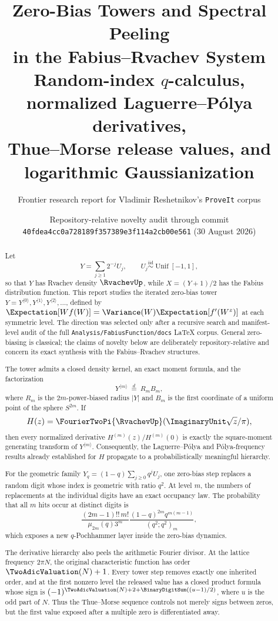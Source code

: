 \documentclass[11pt,oneside]{article}
\title{\bfseries Zero-Bias Towers and Spectral Peeling\\[0.3em]
\Large in the Fabius--Rvachev System\\[0.55em]
\large Random-index $q$-calculus, normalized Laguerre--P\'olya derivatives,\\
Thue--Morse release values, and logarithmic Gaussianization}
\author{Frontier research report for Vladimir Reshetnikov's \texttt{ProveIt} corpus}
\date{Repository-relative novelty audit through commit\\
\texttt{40fdea4cc0a728189f357389e3f114a2cb00e561} (30 August 2026)}
\theoremstyle{definition}
\theoremstyle{remark}
\begin{document}
\maketitle

\begin{abstract}
Let
\[
  Y=\sum_{j\ge1}2^{-j}U_j,
  \qquad U_j\stackrel{\mathrm{iid}}\sim\operatorname{Unif}[-1,1],
\]
so that $Y$ has Rvachev density $\RvachevUp$, while $X=(Y+1)/2$ has the Fabius
distribution function.  This report studies the iterated zero-bias tower
$Y=Y^{\langle0\rangle},Y^{\langle1\rangle},Y^{\langle2\rangle},\ldots$,
defined by
\(
 \Expectation[Wf(W)]=\Variance(W)\Expectation[f'(W^z)]
\)
at each symmetric level.  The direction was selected only after a recursive
search and manifest-level audit of the full \texttt{Analysis/FabiusFunction/docs}
LaTeX corpus.  General zero-biasing is classical; the claims of novelty below
are deliberately repository-relative and concern its exact synthesis with the
Fabius--Rvachev structures.

The tower admits a closed density kernel, an exact moment formula, and the
factorization
\[
 Y^{\langle m\rangle}\ \stackrel d=\ R_m B_m,
\]
where $R_m$ is the $2m$-power-biased radius $|Y|$ and $B_m$ is the first
coordinate of a uniform point of the sphere $S^{2m}$.  If
\[
 H(z)=\FourierTwoPi{\RvachevUp}(\ImaginaryUnit\sqrt z/\pi),
\]
then every normalized derivative $H^{(m)}(z)/H^{(m)}(0)$ is exactly the
square-moment generating transform of $Y^{\langle m\rangle}$.  Consequently,
the Laguerre--P\'olya and P\'olya-frequency results already established for $H$
propagate to a probabilistically meaningful hierarchy.

For the geometric family
\(
Y_q=(1-q)\sum_{j\ge0}q^jU_j
\), one zero-bias step replaces a random digit whose index is geometric with
ratio $q^2$.  At level $m$, the numbers of replacements at the individual
digits have an exact occupancy law.  The probability that all $m$ hits occur
at distinct digits is
\[
 \frac{(2m-1)!!\,m!}{\mu_{2m}(q)3^m}
 \frac{(1-q)^{2m}q^{m(m-1)}}{(q^2;q^2)_m},
\]
which exposes a new $q$-Pochhammer layer inside the zero-bias dynamics.

The derivative hierarchy also peels the arithmetic Fourier divisor.  At the
lattice frequency $2\pi N$, the original characteristic function has order
$\TwoAdicValuation(N)+1$.  Every tower step removes exactly one inherited order, and at the
first nonzero level the released value has a closed product formula whose sign
is
\(
(-1)^{\TwoAdicValuation(N)+2+\BinaryDigitSum((u-1)/2)}
\), where $u$ is the odd part of $N$.  Thus the Thue--Morse sequence controls
not merely signs between zeros, but the first value exposed after a multiple
zero is differentiated away.


\end{abstract}
\end{document}
